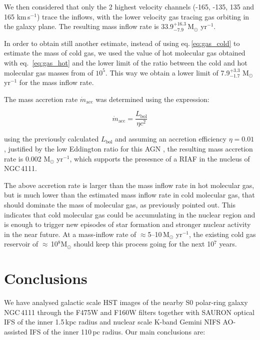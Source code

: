 \documentclass[fleqn,usenatbib]{mnras}
\begin{document}
We then considered that only the 2 highest velocity channels (-165, -135, 135 and 165 km\,s$^{-1}$) trace the inflows, with the lower velocity gas tracing gas orbiting in the galaxy plane. The resulting mass inflow rate is  33.9$^{+16.3}_{-7.9}$\,M$_\odot$ yr$^{-1}$.

In order to obtain still another estimate, instead of using eq.\,\ref{eq:gas_cold} to estimate the mass of cold gas, we used the value of hot molecular gas obtained with eq.~\ref{eq:gas_hot} and the lower limit of the ratio between the cold and hot molecular gas masses from \citet{dale_warm_2005} of $10^5$. This way we obtain a lower limit of 7.9$^{+3.3}_{-1.7}$ M$_\odot$ yr$^{-1}$ for the mass inflow rate.

The mass accretion rate $\dot{m}_\mathrm{acc}$ was determined using the expression:

\begin{equation}
    \dot{m}_\mathrm{acc} = \frac{L_\mathrm{bol}}{\eta c^{2}}
\end{equation}

\noindent using the previously calculated $L_\mathrm{bol}$ and assuming an accretion efficiency $\eta = 0.01$, justified by the low Eddington ratio for this AGN  \citep{nemmen_radiatively_2006}, the resulting mass accretion rate is 0.002 M$_\odot$ yr$^{-1}$, which supports the presesnce of a RIAF in the nucleus of NGC\,4111.

The above accretion rate is larger than the mass inflow rate in hot molecular gas, but is much lower than the estimated mass inflow rate in cold molecular gas, that should dominate the mass of molecular gas, as previously pointed out. This indicates that cold molecular gas could be accumulating in the nuclear region and is enough to trigger new episodes of star formation and stronger nuclear activity in the near future. At a mass-inflow rate of $\approx$5--10\,M$_\odot$ yr$^{-1}$, the existing cold gas reservoir of $\approx$\,10$^{8}$M$_\odot$ should keep this process going for the next 10$^7$ years.

\section{Conclusions}

We have analysed galactic scale HST images of the nearby S0 polar-ring galaxy NGC\,4111 through the F475W and F160W filters together with SAURON optical IFS of the inner 1.5\,kpc radius and nuclear scale K-band Gemini NIFS AO-assisted IFS of the inner 110\,pc radius. Our main conclusions are:
\end{document}
